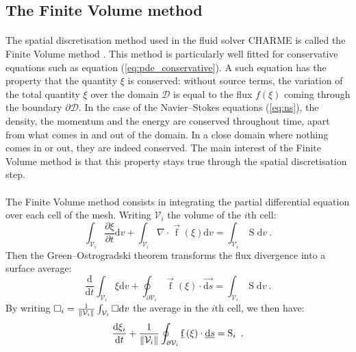     \subsection{The Finite Volume method}

      \paragraph{}
      The spatial discretisation method used in the fluid solver CHARME is called the Finite Volume method \cite{EymardGallouetHerbin2000, Leterrier2003}.
      This method is particularly well fitted for conservative equations such as equation (\ref{eq:pde_conservative}).
      A such equation has the property that the quantity $\xi$ is conserved: without source terms, the variation of the total quantity $\xi$ over the domain $\mathcal{D}$ is equal to the flux $f\left(\xi\right)$ coming through the boundary $\partial\mathcal{D}$.
      In the case of the Navier--Stokes equations (\ref{eq:ns}), the density, the momentum and the energy are conserved throughout time, apart from what comes in and out of the domain.
      In a close domain where nothing comes in or out, they are indeed conserved.
      The main interest of the Finite Volume method is that this property stays true through the spatial discretisation step.

      \paragraph{}
      The Finite Volume method consists in integrating the partial differential equation over each cell of the mesh.
      Writing $\mathcal{V}_i$ the volume of the $i$th cell:
      \begin{equation}
        \int_{\mathcal{V}_i} \frac{\partial \xi}{\partial t} \mathrm{d}v + \int_{\mathcal{V}_i} \nabla\cdot \vec{\operatorname{f}}\left(\xi\right) \mathrm{d}v = \int_{\mathcal{V}_i} \operatorname{S} \mathrm{d}v\ .
      \end{equation}
      Then the Green--Ostrogradski theorem transforms the flux divergence into a surface average:
      \begin{equation}
        \frac{\mathrm{d}}{\mathrm{d} t} \int_{\mathcal{V}_i} \xi\mathrm{d}v + \oint_{\partial\mathcal{V}_i} \vec{\operatorname{f}}\left(\xi\right) \cdot \vec{\mathrm{d}s} = \int_{\mathcal{V}_i} \operatorname{S} \mathrm{d}v\ .
      \end{equation}
      By writing $\square_i = \frac{1}{\norm{\mathcal{V}_i}} \int_{\mathcal{V}_i} \square \mathrm{d}v$ the average in the $i$th cell, we then have:
      \begin{equation}
        \frac{\mathrm{d}\xi_i}{\mathrm{d} t}  + \frac{1}{\norm{\mathcal{V}_i}} \oint_{\partial\mathcal{V}_i} \vec{\operatorname{f}}\left(\xi\right) \cdot \vec{\mathrm{d}s} = \operatorname{S}_i \ .
      \end{equation}

